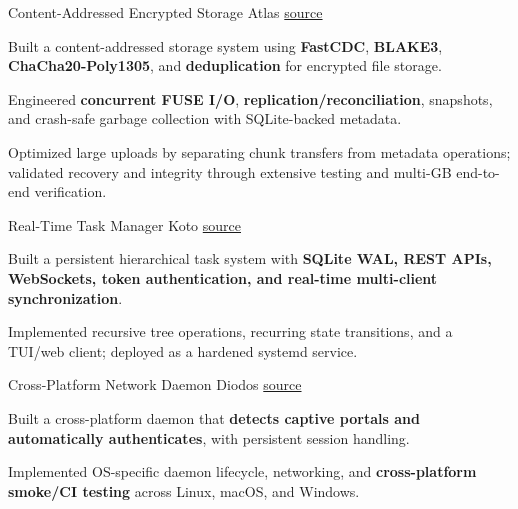 

\begin{cventries}

  \cventry
    {Content-Addressed Encrypted Storage}
    {Atlas}
    {\href{https://codeberg.org/RushiVivek/Atlas}{source}}
    {}
    {
      \begin{cvitems}
        \item {Built a content-addressed storage system using \textbf{FastCDC}, \textbf{BLAKE3}, \textbf{ChaCha20-Poly1305}, and \textbf{deduplication} for encrypted file storage.}
        \item {Engineered \textbf{concurrent FUSE I/O}, \textbf{replication/reconciliation}, snapshots, and crash-safe garbage collection with SQLite-backed metadata.}
        \item {Optimized large uploads by separating chunk transfers from metadata operations; validated recovery and integrity through extensive testing and multi-GB end-to-end verification.}
      \end{cvitems}
    }

  \cventry
    {Real-Time Task Manager}
    {Koto}
    {\href{https://github.com/RushiVivek/Koto}{source}}
    {}
    {
      \begin{cvitems}
        \item {Built a persistent hierarchical task system with \textbf{SQLite WAL, REST APIs, WebSockets, token authentication, and real-time multi-client synchronization}.}
        \item {Implemented recursive tree operations, recurring state transitions, and a TUI/web client; deployed as a hardened systemd service.}
      \end{cvitems}
    }

  \cventry
    {Cross-Platform Network Daemon}
    {Diodos}
    {\href{https://github.com/RushiVivek/Diodos}{source}}
    {}
    {
      \begin{cvitems}
        \item {Built a cross-platform daemon that \textbf{detects captive portals and automatically authenticates}, with persistent session handling.}
        \item {Implemented OS-specific daemon lifecycle, networking, and \textbf{cross-platform smoke/CI testing} across Linux, macOS, and Windows.}
      \end{cvitems}
    }

\end{cventries}
